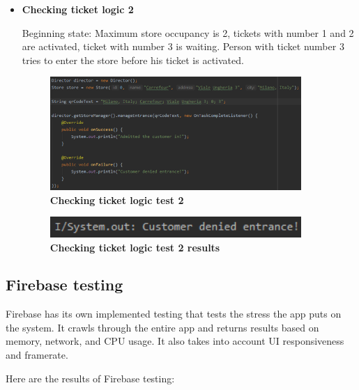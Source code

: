 \begin{itemize}
\item \textbf{Checking ticket logic 2}

Beginning state:\newline
Maximum store occupancy is 2, tickets with number 1 and 2 are activated, ticket with number 3 is waiting.
Person with ticket number 3 tries to enter the store before his ticket is activated.\newline

\begin{figure}[H]
\centering
\includegraphics[width=0.9\textwidth]{Images/TestingPics/Test21}
\caption{\label{fig:test25}\textbf{Checking ticket logic test 2}}
\end{figure}
\begin{figure}[H]
\centering
\includegraphics[width=0.9\textwidth]{Images/TestingPics/Test22}
\caption{\label{fig:test26}\textbf{Checking ticket logic test 2 results}}
\end{figure}

\end{itemize}


\newpage
\subsection{Firebase testing} 
\hspace{\parindent} Firebase has its own implemented testing that tests the stress the app puts on the system. It crawls through the entire app and returns results based on memory, network, and CPU usage. It also takes into account UI responsiveness and framerate.\newline

Here are the results of Firebase testing:\newline 

